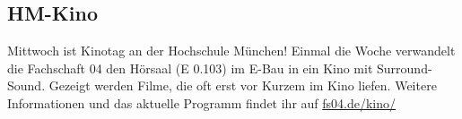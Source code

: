\subsection{HM-Kino}
Mittwoch ist Kinotag an der Hochschule München! \doublebreak
Einmal die Woche verwandelt die Fachschaft 04 den Hörsaal (E 0.103) 
im E-Bau in ein Kino mit Surround-Sound. Gezeigt werden Filme, die oft 
erst vor Kurzem im Kino liefen. \doublebreak
Weitere Informationen und das aktuelle Programm findet ihr auf 
\url{fs04.de/kino/}